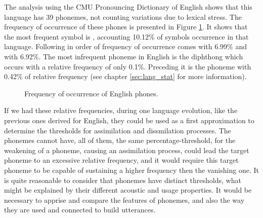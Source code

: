 The analysis using the CMU Pronouncing Dictionary of English shows that this language has 39 phonemes, not counting variations due to lexical stress. The frequency of occurrence of these phones is presented in Figure \ref{fig:phones_hist_en}. It shows that the most frequent symbol is \textipa{[@]}, accounting 10.12\% of symbols occurrence in that language. Following in order of frequency of occurrence comes \textipa{[t]} with 6.99\% and \textipa{[n]} with 6.92\%. The most infrequent phoneme in English is the diphthong \textipa{[OI]} which occurs with a relative frequency of only 0.1\%. Preceding it is the phoneme \textipa{[U]} with 0.42\% of relative frequency (see chapter \ref{sec:lang_stat} for more information).

\begin{figure}[h!]
\noindent{}
\caption{Frequency of occurrence of English phones.}
\label{fig:phones_hist_en}
\end{figure}

If we had these relative frequencies, during one language evolution, like the previous ones derived for English, they could be used as a first approximation to determine the thresholds for assimilation and dissmilation processes. The phonemes cannot have, all of them, the same percentage-threshold, for the weakening of a phoneme, causing an assimilation process, could lead the target phoneme to an excessive relative frequency, and it would require this target phoneme to be capable of sustaining a higher frequency then the vanishing one. It is quite reasonable to consider that phonemes have distinct thresholds, what might be explained by their different acoustic and usage properties. It would be necessary to apprise and compare the features of phonemes, and also the way they are used and connected to build utterances.


